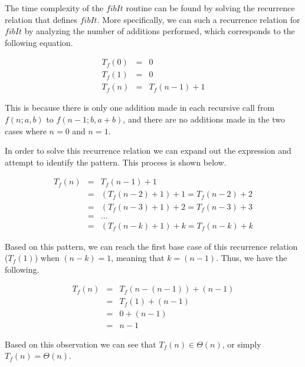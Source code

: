 \documentclass[11pt]{article}
\begin{document}
\begin{prob}{2}
\end{prob}
\begin{sol}

The time complexity of the $fibIt$ routine can be found by solving the recurrence relation that defines $fibIt$. More specifically, we can such a recurrence relation for $fibIt$ by analyzing the number of additions performed, which corresponds to the following equation.

\begin{eqnarray*}
T_{f}(0) & = & 0 \\
T_{f}(1) & = & 0 \\
T_{f}(n) & = & T_{f}(n-1) + 1
\end{eqnarray*}

This is because there is only one addition made in each recursive call from $f(n;a,b)$ to $f(n-1;b,a+b)$, and there are no additions made in the two cases where $n = 0$ and $n = 1$.

In order to solve this recurrence relation we can expand out the expression and attempt to identify the pattern. This process is shown below.

\begin{eqnarray*}
T_{f}(n) & = & T_{f}(n - 1) + 1 \\
& = & (T_{f}(n - 2) + 1) + 1 = T_{f}(n - 2) + 2 \\
& = & (T_{f}(n - 3) + 1) + 2 = T_{f}(n - 3) + 3 \\
& = & ... \\
& = & (T_{f}(n - k) + 1) + k = T_{f}(n - k) + k
\end{eqnarray*}

Based on this pattern, we can reach the first base case of this recurrence relation ($T_{f}(1)$) when $(n - k) = 1$, meaning that $k = (n - 1)$. Thus, we have the following.

\begin{eqnarray*}
T_{f}(n) & = & T_{f}(n - (n - 1)) + (n - 1)  \\
& = & T_{f}(1) + (n - 1) \\
& = & 0 + (n - 1) \\
& = & n - 1
\end{eqnarray*}

Based on this observation we can see that $T_{f}(n) \in \Theta(n)$, or simply $T_{f}(n) = \Theta(n)$. 




\end{sol}
\end{document}
